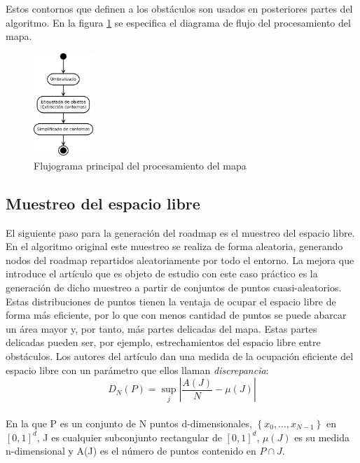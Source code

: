 Estos contornos que definen a los obstáculos son usados en posteriores partes del algoritmo. En la figura \ref{fig:procesado_imagen} se especifica el diagrama de flujo del procesamiento del mapa.\\

\begin{figure}[h]
		\centering
        \includegraphics[width=0.2\textwidth]{images/flujo_imagen.png}
        \caption{Flujograma principal del procesamiento del mapa}
        \label{fig:procesado_imagen}
\end{figure} 

\subsection{Muestreo del espacio libre}

El siguiente paso para la generación del roadmap es el muestreo del espacio libre. En el algoritmo original este muestreo se realiza de forma aleatoria, generando nodos del roadmap repartidos aleatoriamente por todo el entorno. La mejora que introduce el artículo que es objeto de estudio con este caso práctico es la generación de dicho muestreo a partir de conjuntos de puntos cuasi-aleatorios. Estas distribuciones de puntos tienen la ventaja de ocupar el espacio libre de forma más eficiente, por lo que con menos cantidad de puntos se puede abarcar un área mayor y, por tanto, más partes delicadas del mapa. Estas partes delicadas pueden ser, por ejemplo, estrechamientos del espacio libre entre obstáculos. Los autores del artículo dan una medida de la ocupación eficiente del espacio libre con un parámetro que ellos llaman \textit{discrepancia}:\\


 \[ D_N(P) = \sup_{j}{\left| \frac{A(J)}{N} -  \mu(J) \right| }\]\\

En la que P es un conjunto de N puntos d-dimensionales, $\left\lbrace x_0, ... , x_{N-1} \right\rbrace$ en $[0,1]^d$, J es cualquier subconjunto rectangular de $[0,1]^d$, $\mu(J)$ es su medida n-dimensional y A(J) es el número de puntos contenido en $P \cap J$.\\

